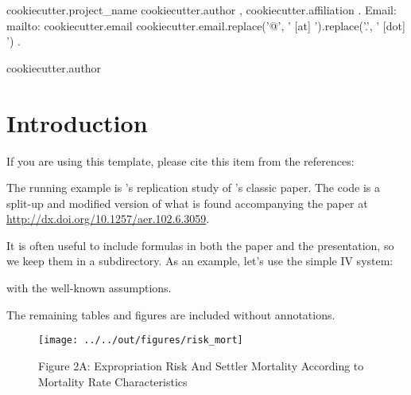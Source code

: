 \documentclass[11pt, a4paper, leqno]{article}
\begin{document}
{%
    {{ cookiecutter.project_name }}
    {%
        {{ cookiecutter.author }}, {{ cookiecutter.affiliation }}. 
        Email: {%
        mailto:{{ cookiecutter.email }}
        } {%
        {{ cookiecutter.email.replace('@', ' [at] ').replace('.', ' [dot] ') }}
        }.
    }
}

{%
    {{ cookiecutter.author }}
}

\date{
{\bf Preliminary -- please do not quote} 
\\[1ex] 
\today
}

\maketitle


\begin{abstract}
	Some abstract here.
\end{abstract}
\clearpage

\section{Introduction} %
\label{sec:introduction}

If you are using this template, please cite this item from the references: \citet{GaudeckerEconProjectTemplates}

The running example is \citeauthor{Albouy12}'s \citeyear{Albouy12} replication study of \citeauthor{AcemogluJohnsonRobinson01}'s classic \citeyear{AcemogluJohnsonRobinson01} paper. The code is a split-up and modified version of what is found accompanying the paper at \url{http://dx.doi.org/10.1257/aer.102.6.3059}.

It is often useful to include formulas in both the paper and the presentation, so we keep them in a subdirectory. As an example, let's use the simple IV system:

with the well-known assumptions.

The remaining tables and figures are included without annotations.\\[4ex]






\begin{figure} 
    \centering   
    \texttt{[image: ../../out/figures/risk\_mort]}
    \caption*{Figure 2A: Expropriation Risk And Settler Mortality According to Mortality Rate Characteristics}
\end{figure}
\end{document}
